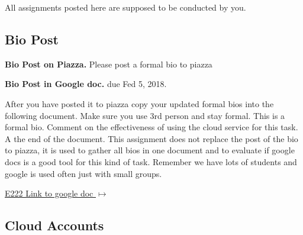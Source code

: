 All assignments posted here are supposed to be conducted by you. 

\subsection{Bio Post}
\label{E:e222-bio}

\begin{exercise}\label{E:e222-bio-piazza}
{\bf Bio Post on Piazza.} Please post a formal bio to piazza
\end{exercise}


\begin{exercise} \label{E:e222-bio-googledocs}

  {\bf Bio Post in Google doc.} due Fed 5, 2018. 
  
  After you have posted it to piazza
  copy your updated formal bios into the following document.  Make
  sure you use 3rd person and stay formal. This is a formal
  bio. Comment on the effectiveness of using the cloud service for
  this task. A the end of the document. This assignment does not
  replace the post of the bio to piazza, it is used to gather all bios
  in one document and to evaluate if google docs is a good tool for
  this kind of task. Remember we have lots of students and google is
  used often just with small groups.
 
 \smallskip

 {\hfill \href{https://docs.google.com/document/d/1pNK94qoRfZkill_JrGAzjd8aQ6Aar0pEXhU_Tgog0W0/edit?usp=sharing}{E222 Link to google doc $\mapsto$}}

 \end{exercise}


\subsection{Cloud Accounts}
\label{E:e222-iu-google-services}

